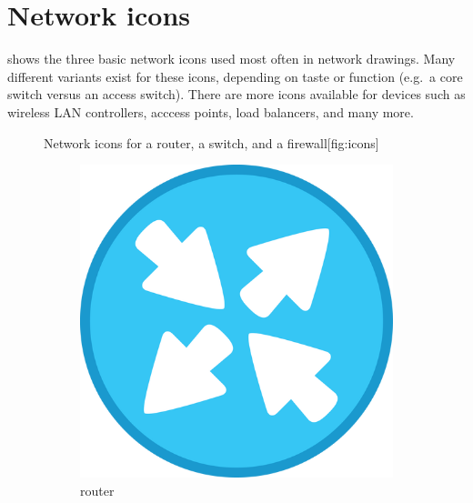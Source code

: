\section{Network icons}
\label{sec:network-icons}

 shows the three basic network icons used most often in network drawings.
Many different variants exist for these icons, depending on taste or function (e.g.~a core switch versus an access switch).
There are more icons available for devices such as wireless \acs{LAN} controllers, acccess points, load balancers, and many more.
\begin{figure}
\begin{sidecaption}{Network icons for a router, a switch, and a firewall}[fig:icons]
   \centering
   \begin{subfigure}[b]{18mm}
   \includegraphics[width=\textwidth]{images/introduction/router.jpg}
   \caption{router}
   \label{fig:icon-router}
   \end{subfigure}
   \qquad
   \begin{subfigure}[b]{18mm}

\end{subfigure}
\end{sidecaption}
\end{figure}
